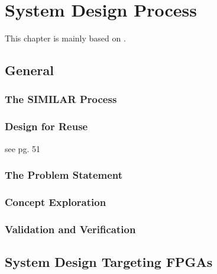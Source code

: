 \chapter{System Design Process}
\label{cha:SystemDesignProcess}

This chapter is mainly based on \cite{BahillA.Terry2017TDiS}\cite{GesslerRalf2014EES}.

\section{General}

\subsection{The SIMILAR Process}

\subsection{Design for Reuse}
see pg. 51

\subsection{The Problem Statement}

\subsection{Concept Exploration}

\subsection{Validation and Verification}

\section{System Design Targeting FPGAs}
